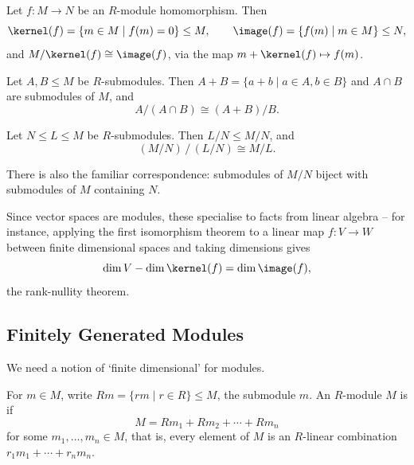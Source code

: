 \begin{theorem}
	Let $f: M \rightarrow N$ be an $R$-module homomorphism. Then
	$$
	\kernel (f) = \{m \in M \mid f(m) = 0\} \leq M, \qquad \image(f) = \{f(m) \mid m \in M\} \leq N,
	$$
	and $M/\kernel(f) \cong \image(f)$, via the map $m + \kernel(f) \mapsto f(m)$.
\end{theorem}

\begin{center}
\end{center}

\begin{theorem}
	Let $A, B \leq M$ be $R$-submodules. Then $A + B = \{a + b \mid a \in A, b \in B\}$ and $A \cap B$ are submodules of $M$, and
	$$
	A/(A \cap B) \cong (A + B)/B.
	$$
\end{theorem}

\begin{theorem}
	Let $N \leq L \leq M$ be $R$-submodules. Then $L/N \leq M/N$, and
	$$
	(M/N) \,/\, (L/N) \cong M/L.
	$$
\end{theorem}

There is also the familiar correspondence: submodules of $M/N$ biject with submodules of $M$ containing $N$.

\begin{remark}
	Since vector spaces are modules, these specialise to facts from linear algebra -- for instance, applying the first isomorphism theorem to a linear map $f: V \rightarrow W$ between finite dimensional spaces and taking dimensions gives
	$$
	\dim V - \dim \kernel(f) = \dim \image(f),
	$$
	the rank-nullity theorem.
\end{remark}

\subsection{Finitely Generated Modules}

We need a notion of `finite dimensional' for modules.

\begin{definition}[Generation]
	For $m \in M$, write $Rm = \{rm \mid r \in R\} \leq M$, the submodule  $m$. An $R$-module $M$ is  if
	$$
	M = Rm_1 + Rm_2 + \cdots + Rm_n
	$$
	for some $m_1, \dots, m_n \in M$, that is, every element of $M$ is an $R$-linear combination $r_1 m_1 + \cdots + r_n m_n$.
\end{definition}

